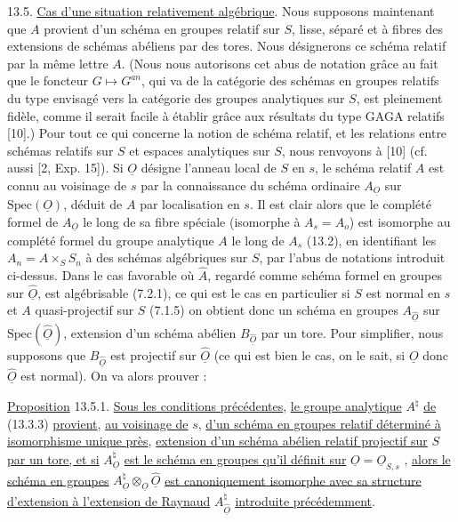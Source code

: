 13.5. \underline{Cas d'une situation relativement algébrique}. Nous supposons maintenant que $A$ provient d'un schéma en groupes relatif sur $S$, lisse, séparé et à fibres des extensions de schémas abéliens par des tores. Nous désignerons ce schéma relatif par la même lettre $A$. (Nous nous autorisons cet abus de notation grâce au fait que le foncteur $G \longmapsto G^{an}$, qui va de la catégorie des schémas en groupes relatifs du type envisagé vers la catégorie des groupes analytiques sur $S$, est pleinement fidèle, comme il serait facile à établir grâce aux résultats du type GAGA relatifs [10].) Pour tout ce qui concerne la notion de schéma relatif, et les relations entre schémas relatifs sur $S$ et espaces analytiques sur $S$, nous renvoyons à [10] (cf. aussi [2, Exp. 15]). Si $\underline{O}$ désigne l'anneau local de $S$ en $s$, le schéma relatif $A$ est connu au voisinage de $s$ par la connaissance du schéma ordinaire $A_{\underline{O}}$ sur $\mathrm{Spec}(\underline{O})$, déduit de $A$ par localisation en $s$. Il est clair alors que le complété formel de $A_{\underline{O}}$ le long de sa fibre spéciale (isomorphe à $A_s = A_o$) est isomorphe au complété formel du groupe analytique $A$ le long de $A_s$ (13.2), en identifiant les $A_n = A \times_S S_n$ à des schémas algébriques sur $S$, par l'abus de notations introduit ci-dessus. Dans le cas favorable où $\hat{A}$, regardé comme schéma formel en groupes sur $\hat{\underline{O}}$, est algébrisable (7.2.1), ce qui est le cas en particulier si $S$ est normal en $s$ et $A$ quasi-projectif sur $S$ (7.1.5) on obtient donc un schéma en groupes $A_{\hat{\underline{O}}}$ sur $\mathrm{Spec}(\hat{\underline{O}})$, extension d'un schéma abélien $B_{\hat{\underline{O}}}$ par un tore. Pour simplifier, nous supposons que $B_{\hat{\underline{O}}}$ est projectif sur $\hat{\underline{O}}$ (ce qui est bien le cas, on le sait, si $\underline{O}$ donc $\hat{\underline{O}}$ est normal). On va alors prouver :



\underline{Proposition} 13.5.1. \underline{Sous les conditions précédentes}, \underline{le groupe analytique} $A^\natural$ \underline{de} (13.3.3) \underline{provient}, \underline{au voisinage de} $s$, \underline{d'un schéma en groupes relatif déterminé à isomorphisme unique près}, \underline{extension d'un schéma abélien relatif projectif sur} $S$ \underline{par un tore, et si} $A^\natural_{\underline{O}}$ \underline{est le schéma en groupes qu'il définit sur} $\underline{O} = \underline{O}_{S,s}$ , \underline{alors le schéma en groupes} $A^\natural_{\underline{O}} \otimes_{\underline{O}} \hat{\underline{O}}$ \underline{est canoniquement isomorphe avec sa structure d'extension à l'extension de Raynaud} $A^\natural_{\hat{\underline{O}}}$ \underline{introduite précédemment}.

